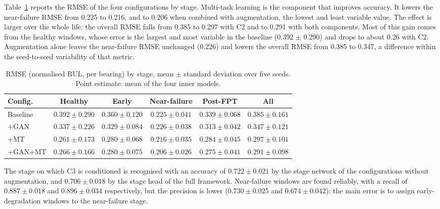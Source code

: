 Table~\ref{tab:rmse} reports the RMSE of the four configurations by
stage. Multi-task learning is the component that improves accuracy.
It lowers the near-failure RMSE from 0.225 to 0.216, and to 0.206 when
combined with augmentation, the lowest and least variable value. The
effect is larger over the whole life: the overall RMSE falls from 0.385
to 0.297 with C2 and to 0.291 with both components. Most of this gain
comes from the healthy windows, whose error is the largest and most
variable in the baseline (0.392 $\pm$ 0.290) and drops to about 0.26
with C2. Augmentation alone leaves the near-failure RMSE unchanged
(0.226) and lowers the overall RMSE from 0.385 to 0.347, a difference
within the seed-to-seed variability of that metric.

\begin{table}[htbp]
\centering
\caption{RMSE (normalised RUL, per bearing) by stage, mean $\pm$
standard deviation over five seeds. Point estimate: mean of the four
inner models.}
\label{tab:rmse}
\footnotesize
\renewcommand{\arraystretch}{1.2}
\setlength{\tabcolsep}{4pt}
\begin{tabular}{lccccc}
\toprule
\textbf{Config.} & \textbf{Healthy} & \textbf{Early} &
\textbf{Near-failure} & \textbf{Post-FPT} & \textbf{All} \\
\midrule
Baseline & $0.392 \pm 0.290$ & $0.360 \pm 0.120$ & $0.225 \pm 0.041$ & $0.339 \pm 0.068$ & $0.385 \pm 0.161$ \\
+GAN     & $0.337 \pm 0.226$ & $0.329 \pm 0.084$ & $0.226 \pm 0.038$ & $0.313 \pm 0.042$ & $0.347 \pm 0.121$ \\
+MT      & $0.261 \pm 0.173$ & $0.280 \pm 0.068$ & $0.216 \pm 0.035$ & $0.284 \pm 0.045$ & $0.297 \pm 0.101$ \\
+GAN+MT  & $0.266 \pm 0.166$ & $0.280 \pm 0.075$ & $\mathbf{0.206 \pm 0.026}$ & $\mathbf{0.275 \pm 0.041}$ & $\mathbf{0.291 \pm 0.098}$ \\
\bottomrule
\end{tabular}
\end{table}

The stage on which C3 is conditioned is recognised with an accuracy of
$0.722 \pm 0.021$ by the stage network of the configurations without
augmentation, and $0.706 \pm 0.018$ by the stage head of the full
framework. Near-failure windows are found reliably, with a recall of
$0.887 \pm 0.018$ and $0.896 \pm 0.034$ respectively, but the
precision is lower ($0.730 \pm 0.025$ and $0.674 \pm 0.042$): the
main error is to assign early-degradation windows to the near-failure
stage.


